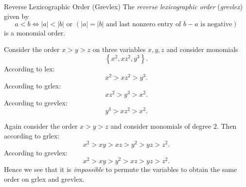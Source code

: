 \documentclass[co439]{subfiles}
\begin{document}
    \rruleline

    \begin{example}{Reverse Lexicographic Order (Grevlex)}
        The \emph{reverse lexicographic order} (\emph{grevlex}) given by
        \begin{equation*}
            a<b\iff\text{$\left| a \right|<\left| b \right|$ or $\left( \left| a \right|=\left| b \right|\text{ and last nonzero entry of $b-a$ is negative} \right)$}
        \end{equation*}
        is a monomial order.
    \end{example}

    \rruleline

    \begin{example}{}
        Consider the order $x>y>z$ on three variables $x,y,z$ and consider monomials
        \begin{equation*}
            \left\lbrace x^{2},xz^{2},y^{3} \right\rbrace.
        \end{equation*}
        According to lex:
        \begin{equation*}
            x^{2} > xz^{2} > y^{3}.
        \end{equation*}
        According to grlex:
        \begin{equation*}
            xz^{2} > y^{3} > x^{2}.
        \end{equation*}
        According to grevlex:
        \begin{equation*}
            y^{3} > xz^{2} > x^{2}.
        \end{equation*}
    \end{example}

    \rruleline

    \begin{example}{}
        Again consider the order $x>y>z$ and consider monomials of degree $2$. Then according to grlex:
        \begin{equation*}
            x^{2} > xy > xz > y^{2} > yz > z^{2}.
        \end{equation*}
        According to grevlex:
        \begin{equation*}
            x^{2} > xy > y^{2} > xz > yz > z^{2}.
        \end{equation*}
        Hence we see that it is \textit{impossible} to permute the variables to obtain the same order on grlex and grevlex.
    \end{example}

    \rruleline
    
\end{document}
